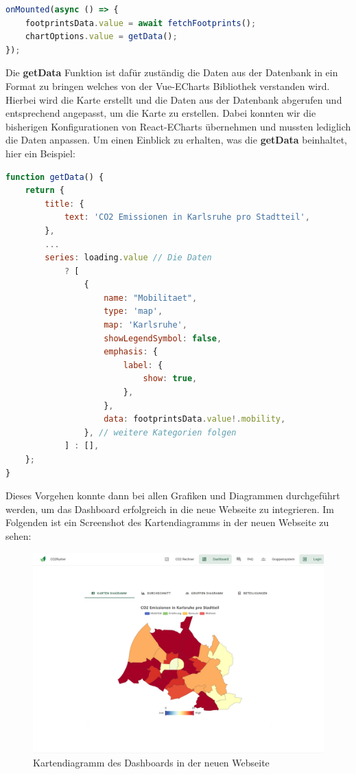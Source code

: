 \begin{lstlisting}[language={JavaScript}, caption={Laden der Fußabdrücke und erstellen der Diagramm Daten und Konfiguration}]
onMounted(async () => {
    footprintsData.value = await fetchFootprints();
    chartOptions.value = getData();
});
\end{lstlisting}

Die \textbf{getData} Funktion ist dafür zuständig die Daten aus der Datenbank in ein Format zu bringen welches von der Vue-ECharts Bibliothek verstanden wird. Hierbei wird die Karte erstellt und die Daten aus der Datenbank abgerufen und entsprechend angepasst, um die Karte zu erstellen. Dabei konnten wir die bisherigen Konfigurationen von React-ECharts übernehmen und mussten lediglich die Daten anpassen. Um einen Einblick zu erhalten, was die \textbf{getData} beinhaltet, hier ein Beispiel:

\begin{lstlisting}[language={JavaScript}, caption={Beispiel Konfiguration für ECharts Diagramme}]
function getData() {
    return {
        title: {
            text: 'CO2 Emissionen in Karlsruhe pro Stadtteil',
        },
        ...
        series: loading.value // Die Daten
            ? [
                {
                    name: "Mobilitaet",
                    type: 'map',
                    map: 'Karlsruhe',
                    showLegendSymbol: false,
                    emphasis: {
                        label: {
                            show: true,
                        },
                    },
                    data: footprintsData.value!.mobility,
                }, // weitere Kategorien folgen
            ] : [],
    };
}
\end{lstlisting}

Dieses Vorgehen konnte dann bei allen Grafiken und Diagrammen durchgeführt werden, um das Dashboard erfolgreich in die neue Webseite zu integrieren. Im Folgenden ist ein Screenshot des Kartendiagramms in der neuen Webseite zu sehen:

\begin{figure}[H]
    \centering
    \includegraphics[width=1\textwidth]{images/06/Dashboard-Design.jpeg}
    \caption{Kartendiagramm des Dashboards in der neuen Webseite}
    \label{fig:new-co2runter-dashboard-design}
\end{figure}

